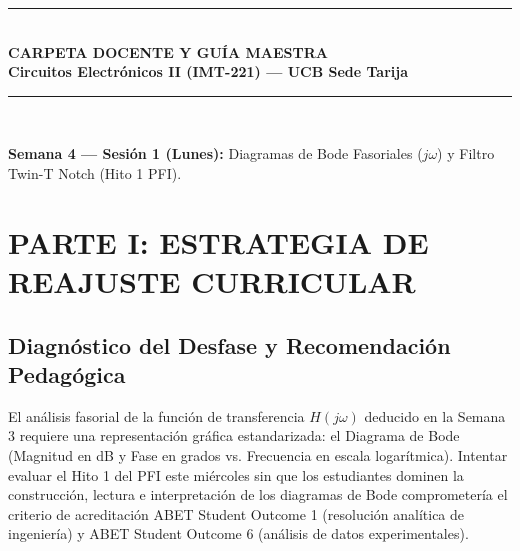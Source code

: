 \documentclass[11pt,a4paper,twoside]{article}
\begin{document}
\begin{center}
    \rule{\textwidth}{1.5pt}\\[0.4cm]
    {\huge \textbf{CARPETA DOCENTE Y GUÍA MAESTRA}}\\[0.2cm]
    {\LARGE \textbf{Circuitos Electrónicos II (IMT-221) — UCB Sede Tarija}}\\[0.3cm]
    \rule{\textwidth}{1.5pt}\\[0.5cm]
\end{center}

\noindent\textbf{Semana 4 — Sesión 1 (Lunes):} Diagramas de Bode Fasoriales ($j\omega$) y Filtro Twin-T Notch (Hito 1 PFI).

\section{PARTE I: ESTRATEGIA DE REAJUSTE CURRICULAR}
\subsection*{Diagnóstico del Desfase y Recomendación Pedagógica}
El análisis fasorial de la función de transferencia $H(j\omega)$ deducido en la Semana 3 requiere una representación gráfica estandarizada: el Diagrama de Bode (Magnitud en dB y Fase en grados vs. Frecuencia en escala logarítmica). Intentar evaluar el Hito 1 del PFI este miércoles sin que los estudiantes dominen la construcción, lectura e interpretación de los diagramas de Bode comprometería el criterio de acreditación ABET Student Outcome 1 (resolución analítica de ingeniería) y ABET Student Outcome 6 (análisis de datos experimentales).
\end{document}
